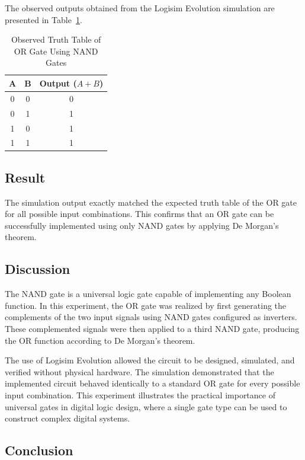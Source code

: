 \documentclass[12pt,a4paper]{article}
\begin{document}
The observed outputs obtained from the Logisim Evolution simulation are presented in Table~\ref{tab:or_truth}.

\begin{table}[H]
\centering
\caption{Observed Truth Table of OR Gate Using NAND Gates}
\label{tab:or_truth}
\begin{tabular}{|c|c|c|}
\hline
A & B & Output ($A+B$)\\
\hline
0 & 0 & 0\\
0 & 1 & 1\\
1 & 0 & 1\\
1 & 1 & 1\\
\hline
\end{tabular}
\end{table}

\subsection{Result}

The simulation output exactly matched the expected truth table of the OR gate for all possible input combinations. This confirms that an OR gate can be successfully implemented using only NAND gates by applying De Morgan's theorem.

\subsection{Discussion}

The NAND gate is a universal logic gate capable of implementing any Boolean function. In this experiment, the OR gate was realized by first generating the complements of the two input signals using NAND gates configured as inverters. These complemented signals were then applied to a third NAND gate, producing the OR function according to De Morgan's theorem.

The use of Logisim Evolution allowed the circuit to be designed, simulated, and verified without physical hardware. The simulation demonstrated that the implemented circuit behaved identically to a standard OR gate for every possible input combination. This experiment illustrates the practical importance of universal gates in digital logic design, where a single gate type can be used to construct complex digital systems.

\subsection{Conclusion}
\end{document}
